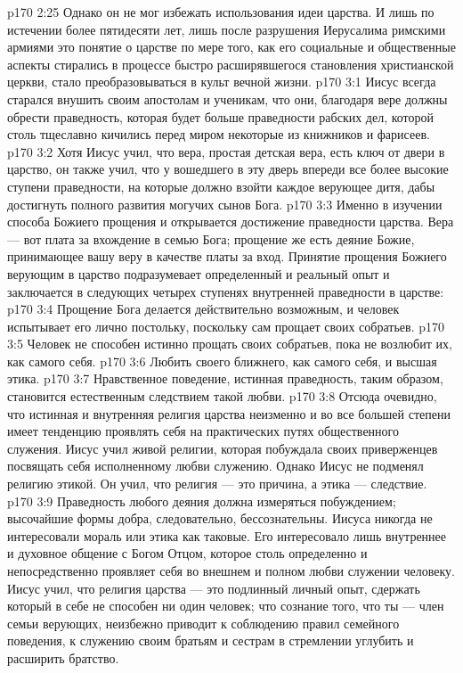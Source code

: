 \vs p170 2:25 Однако он не мог избежать использования идеи царства. И лишь по истечении более пятидесяти лет, лишь после разрушения Иерусалима римскими армиями это понятие о царстве по мере того, как его социальные и общественные аспекты стирались в процессе быстро расширявшегося становления христианской церкви, стало преобразовываться в культ вечной жизни.
\vs p170 3:1 Иисус всегда старался внушить своим апостолам и ученикам, что они, благодаря вере должны обрести праведность, которая будет больше праведности рабских дел, которой столь тщеславно кичились перед миром некоторые из книжников и фарисеев.
\vs p170 3:2 Хотя Иисус учил, что вера, простая детская вера, есть ключ от двери в царство, он также учил, что у вошедшего в эту дверь впереди все более высокие ступени праведности, на которые должно взойти каждое верующее дитя, дабы достигнуть полного развития могучих сынов Бога.
\vs p170 3:3 Именно в изучении способа  Божиего прощения и открывается достижение праведности царства. Вера --- вот плата за вхождение в семью Бога; прощение же есть деяние Божие, принимающее вашу веру в качестве платы за вход. Принятие прощения Божиего верующим в царство подразумевает определенный и реальный опыт и заключается в следующих четырех ступенях внутренней праведности в царстве:
\vs p170 3:4 \bibnobreakspace Прощение Бога делается действительно возможным, и человек испытывает его лично постольку, поскольку сам прощает своих собратьев.
\vs p170 3:5 \bibnobreakspace Человек не способен истинно прощать своих собратьев, пока не возлюбит их, как самого себя.
\vs p170 3:6 \bibnobreakspace Любить своего ближнего, как самого себя, и  высшая этика.
\vs p170 3:7 \bibnobreakspace Нравственное поведение, истинная праведность, таким образом, становится естественным следствием такой любви.
\vs p170 3:8 \pc Отсюда очевидно, что истинная и внутренняя религия царства неизменно и во все большей степени имеет тенденцию проявлять себя на практических путях общественного служения. Иисус учил живой религии, которая побуждала своих приверженцев посвящать себя исполненному любви служению. Однако Иисус не подменял религию этикой. Он учил, что религия --- это причина, а этика --- следствие.
\vs p170 3:9 Праведность любого деяния должна измеряться побуждением; высочайшие формы добра, следовательно, бессознательны. Иисуса никогда не интересовали мораль или этика как таковые. Его интересовало лишь внутреннее и духовное общение с Богом Отцом, которое столь определенно и непосредственно проявляет себя во внешнем и полном любви служении человеку. Иисус учил, что религия царства --- это подлинный личный опыт, сдержать который в себе не способен ни один человек; что сознание того, что ты --- член семьи верующих, неизбежно приводит к соблюдению правил семейного поведения, к служению своим братьям и сестрам в стремлении углубить и расширить братство.

